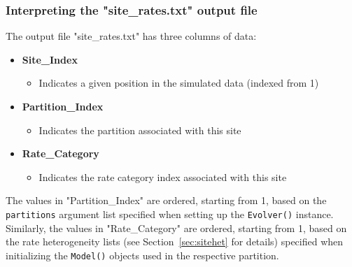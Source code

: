 \documentclass{article}
\newcommand{\code}[1]{\texttt{\small{#1}}}
\begin{document}
\subsubsection{Interpreting the "site\_rates.txt" output file}\label{sec:ratefile}
The output file "site\_rates.txt" has three columns of data:
\begin{itemize}
	\item \textbf{Site\_Index}
	\begin{itemize}
		\item Indicates a given position in the simulated data (indexed from 1)
	\end{itemize}
	\item \textbf{Partition\_Index}
	\begin{itemize}
		\item Indicates the partition associated with this site
	\end{itemize}
	\item \textbf{Rate\_Category}
	\begin{itemize}
		\item Indicates the rate category index associated with this site
	\end{itemize}
\end{itemize}


The values in "Partition\_Index" are ordered, starting from 1, based on the \code{partitions} argument list specified when setting up the \code{Evolver()} instance. Similarly, the values in "Rate\_Category" are ordered, starting from 1, based on the rate heterogeneity lists (see Section~\ref{sec:sitehet} for details) specified when initializing the \code{Model()} objects used in the respective partition.
\end{document}
